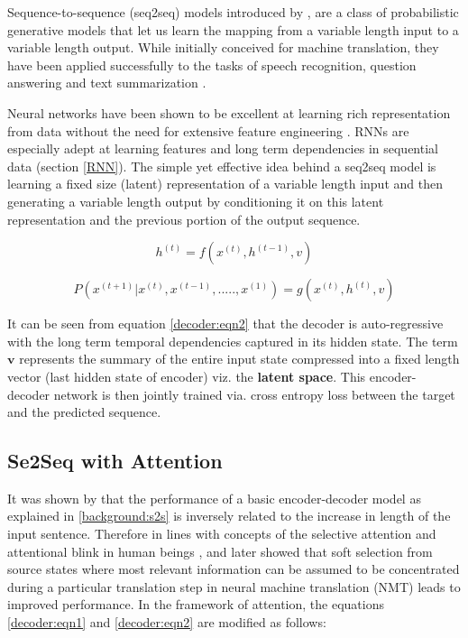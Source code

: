 Sequence-to-sequence (seq2seq) models introduced by \cite{Sutskever2014}, \cite{GRU} are a class of probabilistic generative models that let us learn the mapping from a variable length input to a variable length output. While initially conceived for machine translation, they have been applied successfully to the tasks of speech recognition, question answering and text summarization \citep{Vinyals2015} \citep{anderson2018bottom} \citep{lu2017knowing}.

Neural networks have been shown to be excellent at learning rich representation from data without the need for extensive feature engineering \citep{Hinton2006}. RNNs are especially adept at learning features and long term dependencies in sequential data (section \ref{RNN}). The simple yet effective idea behind a seq2seq model is learning a fixed size (latent) representation of a variable length input and then generating a variable length output by conditioning it on this latent representation and the previous portion of the output sequence.

\begin{equation} \label{decoder:eqn1}
	h^{(t)} = f(x^{(t)}, h^{(t-1)}, v)
\end{equation}

\begin{equation} \label{decoder:eqn2}
	P(x^{(t+1)}|x^{(t)}, x^{(t-1)},.....,x^{(1)}) = g(x^{(t)}, h^{(t)}, v)
\end{equation}

It can be seen from equation \ref{decoder:eqn2} that the decoder is auto-regressive with the long term temporal dependencies captured in its hidden state. The term $\mathbf{v}$ represents the summary of the entire input state compressed into a fixed length vector (last hidden state of encoder) viz. the \textbf{latent space}. This encoder- decoder network is then jointly trained via. cross entropy loss between the target and the predicted sequence.

\subsection{Se2Seq with Attention}\label{mtv:attn}
It was shown by \cite{Cho2014} that the performance of a basic encoder-decoder model as explained in \ref{background:s2s} is inversely related to the increase in length of the input sentence. Therefore in lines with concepts of the selective attention and attentional blink in human beings \citep{purves2013principles}, \cite{Bahdanau2014} and later  \cite{Luong2015} showed that soft selection from source states where most relevant information can be assumed to be concentrated during a particular translation step in neural machine translation (NMT) leads to improved performance. In the \cite{Bahdanau2014} framework of attention, the equations \ref{decoder:eqn1} and \ref{decoder:eqn2} are modified as follows:

